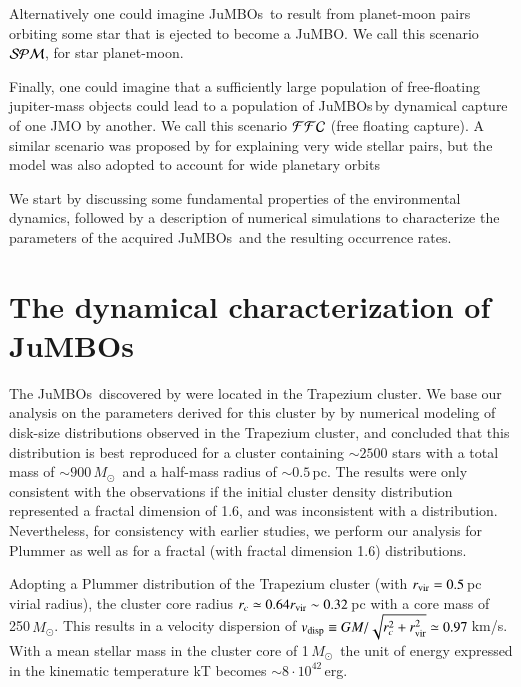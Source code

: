 \documentclass[aa]{lib/aa}
\newcommand{\MSun}{\mbox{${M}_\odot$}}
\newcommand{\jumbo}{\mbox{JuMBO}}
\newcommand{\jumbos}{\mbox{JuMBOs}}
\begin{document}
Alternatively one could imagine \jumbos\, to result from planet-moon
pairs orbiting some star that is ejected to become a \jumbo.  We call
this scenario ${\cal SPM}$, for star planet-moon.

Finally, one could imagine that a sufficiently large population of
free-floating jupiter-mass objects could lead to a population of
\jumbos\,by dynamical capture of one JMO by another.  We call this
scenario ${\cal FFC}$ (free floating capture). A similar scenario was
proposed by \citep{2010MNRAS.404.1835K} for explaining very wide
stellar pairs, but the model was also adopted to account for wide
planetary orbits \citep{2012ApJ...750...83P,2018MNRAS.473.1589G}

We start by discussing some fundamental properties of the
environmental dynamics, followed by a description of numerical
simulations to characterize the parameters of the acquired \jumbos\, and
the resulting occurrence rates. 

\section{The dynamical characterization of \jumbos}

The \jumbos\, discovered by \citep{2023arXiv231001231P} were located
in the Trapezium cluster. We base our analysis on the parameters
derived for this cluster by \citep{2016MNRAS.457..313P} by numerical
modeling of disk-size distributions observed in the Trapezium cluster,
and concluded that this distribution is best reproduced for a cluster
containing $\sim 2500$ stars with a total mass of $\sim 900$\,\MSun\,
and a half-mass radius of $\sim 0.5$\,pc. The results were only
consistent with the observations if the initial cluster density
distribution represented a fractal dimension of 1.6, and was
inconsistent with a \citep{1911MNRAS..71..460P} distribution.
Nevertheless, for consistency with earlier studies, we perform our
analysis for Plummer as well as for a fractal (with fractal dimension
1.6) distributions.

Adopting a Plummer distribution of the Trapezium cluster (with $r_{\rm
  vir} = 0.5$\,pc virial radius), the cluster core radius $r_c \simeq
0.64r_{\rm vir} \sim 0.32$\,pc with a core mass of 250\,\MSun. This
results in a velocity dispersion of $v_{\rm disp} \equiv
GM/\sqrt{r_c^2 + r_{\rm vir}^2} \simeq 0.97$\,km/s. With a mean
stellar mass in the cluster core of 1\,\MSun\, the unit of energy
expressed in the kinematic temperature kT becomes $\sim 8 \cdot
10^{42}$\,erg.
\end{document}

